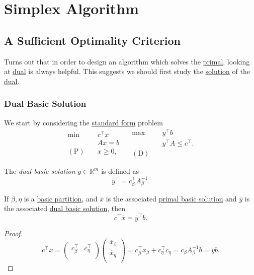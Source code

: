 \chapter{Simplex Algorithm}
\section{A Sufficient Optimality Criterion}
Turns out that in order to design an algorithm which solves the \hyperref[def:primal]{primal}, looking at \hyperref[def:dual]{dual} is always helpful. This suggests we should first study the \hyperref[def:solution]{solution} of the \hyperref[def:dual]{dual}.

\subsection{Dual Basic Solution}
We start by considering the \hyperref[def:standard-form]{standard form} problem
\[
	\begin{aligned}
		\min~             & c^{\top}x \\
		                  & Ax = b    \\
		(\mathrm{P})\quad & x\geq  0,
	\end{aligned}\quad \begin{aligned}
		\max ~            & y^{\top}b               \\
		                  & y^{\top}A\leq c^{\top}. \\
		(\mathrm{D})\quad &
	\end{aligned}
\]

\begin{definition}\label{def:dual-basic-solution}
	The \emph{dual basic solution} \(\overline{y}\in \mathbb{R}^m\) is defined as
	\[
		\overline{y}^{\top} = c_{\beta}^{\top} A^{-1}_{\beta}.
	\]
\end{definition}

\begin{lemma}\label{lma:lec7-1}
	If \(\beta, \eta\) is a \hyperref[def:basic-partition]{basic partition}, and \(\overline{x}\) is the associated \hyperref[def:basic-solution]{primal basic solution}
	and \(\overline{y}\) is the associated \hyperref[def:dual-basic-solution]{dual basic solution}, then
	\[
		c^{\top}\overline{x} = \overline{y}^{\top} b.
	\]
\end{lemma}
\begin{proof}
	\[
		c^{\top}\overline{x} = \begin{pmatrix}
			c^{\top}_{\beta} & c^{\top}_{\eta} \\
		\end{pmatrix}\begin{pmatrix}
			\overline{x}_{\beta} \\
			\overline{x}_{\eta}  \\
		\end{pmatrix}= c_{\beta}^{\top} \overline{x}_{\beta}+ c_{\eta}^{\top} \overline{c}_{\eta} = c_{\beta} A^{-1}_{\beta}b = \overline{y}b.
	\]
\end{proof}

